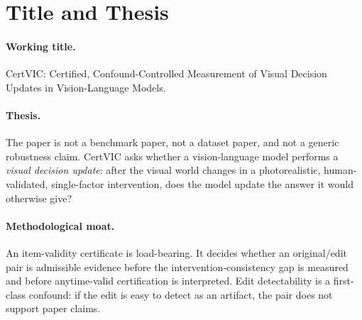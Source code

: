 \section{Title and Thesis}

\paragraph{Working title.}
CertVIC: Certified, Confound-Controlled Measurement of Visual Decision Updates
in Vision-Language Models.

\paragraph{Thesis.}
The paper is not a benchmark paper, not a dataset paper, and not a generic
robustness claim. CertVIC asks whether a vision-language model performs a
\emph{visual decision update}: after the visual world changes in a
photorealistic, human-validated, single-factor intervention, does the model
update the answer it would otherwise give?

\paragraph{Methodological moat.}
An item-validity certificate is load-bearing. It decides whether an original/edit
pair is admissible evidence before the intervention-consistency gap is measured
and before anytime-valid certification is interpreted. Edit detectability is a
first-class confound: if the edit is easy to detect as an artifact, the pair
does not support paper claims.

